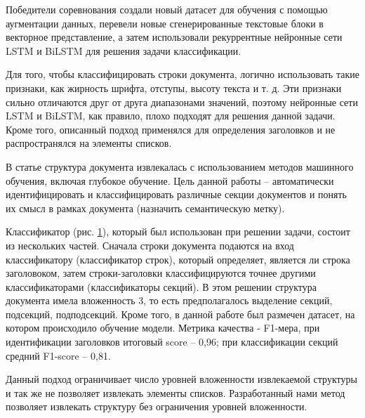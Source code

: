 \documentclass{ProcISPRAS}
\begin{document}
Победители соревнования \cite{fintoc19tian} создали новый датасет для обучения с помощью аугментации данных, перевели новые сгенерированные текстовые блоки в векторное представление, а затем использовали рекуррентные нейронные сети LSTM и BiLSTM для решения задачи классификации.

Для того, чтобы классифицировать строки документа, логично использовать такие признаки, как жирность шрифта, отступы, высоту текста и т. д. Эти признаки сильно отличаются друг от друга диапазонами значений, поэтому нейронные сети LSTM и BiLSTM, как правило, плохо подходят для решения данной задачи. Кроме того, описанный подход применялся для определения заголовков и не распространялся на элементы списков.

В статье \cite{deep} структура документа извлекалась с использованием методов машинного обучения, включая глубокое обучение. Цель данной работы -- автоматически идентифицировать и классифицировать различные секции документов и понять их смысл в рамках документа (назначить семантическую метку).

\begin{figure}[ht]
    \label{fig:classifier}
\end{figure}

Классификатор (рис. \ref{fig:classifier}), который был использован при решении задачи, состоит из нескольких частей. Сначала строки документа подаются на вход классификатору (классификатор строк), который определяет, является ли строка заголовоком, затем строки-заголовки классифицируются точнее другими классификаторами (классификаторы секций). В этом решении структура документа имела вложенность 3, то есть предполагалось выделение секций, подсекций, подподсекций.
Кроме того, в данной работе был размечен датасет, на котором происходило обучение модели. Метрика качества - F1-мера, при идентификации заголовков итоговый score -- 0,96; при классификации секций средний F1-score -- 0,81.

Данный подход ограничивает число уровней вложенности извлекаемой структуры и так же не позволяет извлекать элементы списков. Разработанный нами метод позволяет извлекать структуру без ограничения уровней вложенности.
\end{document}
